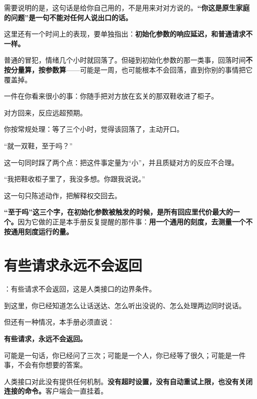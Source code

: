 需要说明的是，这句话是给你自己用的，不是用来对对方说的。\textbf{“你这是原生家庭的问题”是一句不能对任何人说出口的话。}

这里还有一个时间上的表现，要单独指出：\textbf{初始化参数的响应延迟，和普通请求不一样。}

普通的冒犯，情绪几个小时就回落了。但碰到初始化参数的那一类事，回落时间\textbf{不按分量算，按参数算}——可能是一周，也可能根本不会回落，直到你别的事情把它覆盖掉。

\begin{mdquote}


\vspace{0.3\baselineskip}

一件在你看来很小的事：你随手把对方放在玄关的那双鞋收进了柜子。\par
对方回来，反应远超预期。

\vspace{0.3\baselineskip}

你按常规处理：等了三个小时，觉得该回落了，主动开口。\par
{}“就一双鞋，至于吗？”\par
这一句同时踩了两个点：把这件事定量为“小”，并且质疑对方的反应不合理。

\vspace{0.3\baselineskip}

“我把鞋收柜子里了，我没多想。你跟我说说。”\par
这一句只陈述动作，把解释权交回去。
\end{mdquote}

\textbf{“至于吗”这三个字，在初始化参数被触发的时候，是所有回应里代价最大的一个。}因为它做的正是本手册反复提醒的那件事：\textbf{用一个通用的刻度，去测量一个不按通用刻度运行的量。}

\section{有些请求永远不会返回}

：有些请求不会返回，这是人类接口的边界条件。

到这里，你已经知道怎么让话送达、怎么听出没说的、怎么处理两边同时说话。

但还有一种情况，本手册必须直说：

\textbf{有些请求，永远不会返回。}

可能是一句话，你已经问了三次；可能是一个人，你已经等了很久；可能是一件事，不会有你想要的答案。

人类接口对此没有提供任何机制。\textbf{没有超时设置，没有自动重试上限，也没有关闭连接的命令。}客户端会一直挂着。

